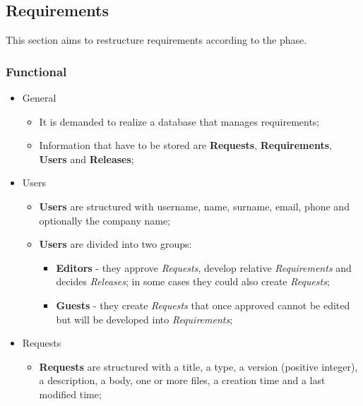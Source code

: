 \documentclass[12pt, a4paper]{report}
\begin{document}
\subsection*{Requirements}

This section aims to restructure requirements according to the  phase.

\subsubsection*{Functional}

\begin{itemize}
    \item General
    \begin{itemize}
        \item It is demanded to realize a database that manages requirements;
        \item Information that have to be stored are \textbf{Requests}, \textbf{Requirements}, \textbf{Users} and \textbf{Releases}; %
    \end{itemize}
    \item Users
    \begin{itemize}
        \item \textbf{Users} are structured with username, name, surname, email, phone and optionally the company name;
        \item \textbf{Users} are divided into two groups:
            \begin{itemize}
                \item \textbf{Editors} - they approve \emph{Requests}, develop relative \emph{Requirements} and decides \emph{Releases};
                    in some cases they could also create \emph{Requests};
                \item \textbf{Guests} - they create \emph{Requests} that once approved cannot be edited but will be developed into
                    \emph{Requirements};
            \end{itemize}
    \end{itemize}
    \item Requests
    \begin{itemize}
        \item \textbf{Requests} are structured with a title, a type, a version (positive integer), a description, a body, one or more
            files, a creation time and a last modified time;
    \end{itemize}

\end{itemize}
\end{document}

